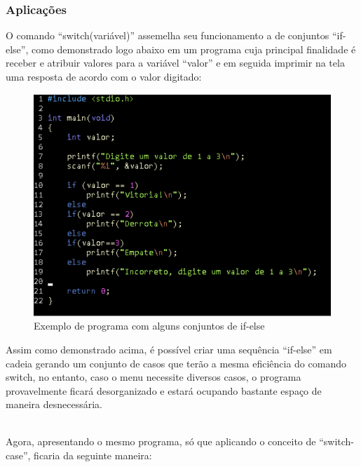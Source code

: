 \documentclass[a4paper,12pt]{article}  %
\begin{document}
  \subsubsection{Aplicações}

   O comando “switch(variável)” assemelha seu funcionamento a de conjuntos “if-else”, como demonstrado logo abaixo em um programa cuja principal finalidade é receber e atribuir valores para a variável “valor” e em seguida imprimir na tela uma resposta de acordo com o valor digitado: 

 \begin{figure}[H]
 \centering
 \includegraphics[width=.80\linewidth]{imagens/ex2.png}
 \caption{Exemplo de programa com alguns conjuntos de if-else}
 \label{fig:xsorta}
\end{figure}

   Assim como demonstrado acima, é possível criar uma sequência “if-else” em cadeia gerando um conjunto de casos que terão a mesma eficiência do comando switch, no entanto, caso o menu necessite diversos casos, o programa provavelmente ficará desorganizado e estará ocupando bastante espaço de maneira desnecessária. \par
   
\\
  
   Agora, apresentando o mesmo programa, só que aplicando o conceito de “switch-case”, ficaria da seguinte maneira:
\end{document}
